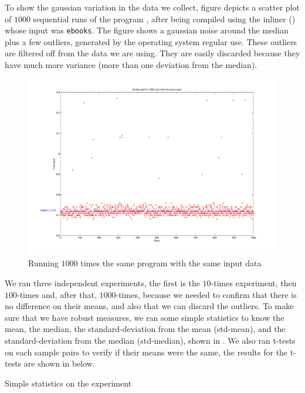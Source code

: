 
To show the gaussian variation in the data we collect, figure  depicts a scatter plot of $1000$ sequential runs of the program \bzip, after being compiled using the  inliner (\llvm) whose input was {\tt ebooks}. The figure shows a gaussian noise around the median plus a few outliers, generated by the operating system regular use. These outliers are filtered off from the data we are using. They are easily discarded because they have much more variance (more than one deviation from the median).

\begin{figure}
  \centering
  \includegraphics[width=1.00\linewidth]{Figures/nt1000}
  \caption{Running $1000$ times the same program with the same input data}
  \label{fig:gauss}
\end{figure}

We ran three independent experiments, the first is the $10$-times experiment, then $100$-times and, after that, $1000$-times, because we needed to confirm that there is no difference on their means, and also that we can discard the outliers. To make sure that we have robust measures, we ran some simple statistics to know the mean, the median, the standard-deviation from the mean (std-mean), and the standard-deviation from the median (std-median), shown in . We also ran t-tests on each sample pairs to verify if their means were the same, the results for the t-tests are shown in  below.

\begin{table}
  \centering
  \begin{tiny}
  
  \end{tiny}
  \caption{Simple statistics on the experiment}
  \label{tab:robustTest}
\end{table}

